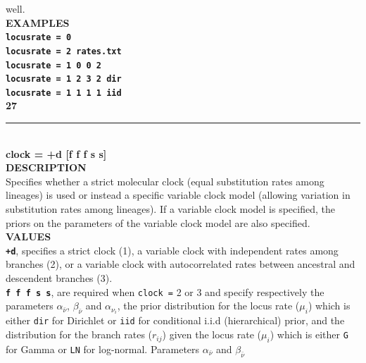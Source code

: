 \documentclass[a4paper]{book}
\numberwithin{equation}{section} \renewcommand{\baselinestretch}{0.55}
\begin{document}
well.
\vspace{5pt}\\
\textbf{EXAMPLES} \vspace{5pt}\\
\textbf{\texttt{locusrate = 0}} \vspace{5pt}\\
\textbf{\texttt{locusrate = 2 rates.txt}}\vspace{5pt}\\
\textbf{\texttt{locusrate = 1 0 0 2}} \vspace{5pt}\\
\textbf{\texttt{locusrate = 1 2 3 2 dir}} \vspace{5pt}\\
\textbf{\texttt{locusrate = 1 1 1 1 iid}} \vspace{10pt}\\
\textbf{{\large 27}} \\
\noindent\rule{\textwidth}{0.8pt} \\
\textbf{{\Large clock = +d [f f f s s] }} \vspace{5pt}\\
\textbf{DESCRIPTION} \vspace{5pt}\\
Specifies whether a strict molecular clock (equal substitution rates
among lineages) is used or instead a specific variable clock model
(allowing variation in substitution rates among lineages).  If a
variable clock model is specified, the priors on the parameters of the
variable clock model
are also specified.\vspace{5pt}\\
\textbf{VALUES} \vspace{5pt}\\
\textbf{\texttt{+d}}, specifies a strict clock (1), a variable clock
with independent rates among branches (2), or a variable clock with
autocorrelated rates between ancestral and descendent branches (3).
\vspace{5pt}\\
\textbf{\texttt{f f f s s}}, are required when \texttt{clock =} 2 or 3
and specify respectively the parameters $\alpha_{\bar{\nu}}$,
$\beta_{\bar{\nu}}$ and $\alpha_{\nu_i}$, the prior distribution for
the locus rate ($\mu_i$) which is either \texttt{dir} for Dirichlet or
\texttt{iid} for conditional i.i.d (hierarchical) prior, and the
distribution for the branch rates ($r_{ij}$) given the locus rate
($\mu_i$) which is either \texttt{G} for Gamma or \texttt{LN} for
log-normal. Parameters $\alpha_{\bar{\nu}}$ and $\beta_{\bar{\nu}}$
\end{document}
